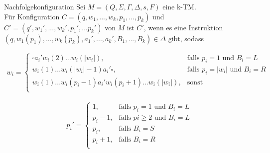 \begin{defn}{Nachfolgekonfiguration}
    Sei $M = (Q, \Sigma, \Gamma, \Delta, s, F)$ eine k-TM. \\

    Für Konfiguration $C=(q,w_1,...,w_k,p_1,...,p_k)$ und $C' = (q', w_1',...,w_k',p_1',...p_k')$ von $M$ ist $C'$, 
    wenn es eine Instruktion $(q, w_1(p_1),...,w_k(p_k),a_1',...,a_k',B_1,...,B_k) \in \Delta$ gibt, sodass

    \begin{align*}  
        w_i =
        \begin{cases} 
            \square a_i' w_i(2) ... w_i(| w_i |), & \text{falls }p_i = 1 \text{ und }  B_i = L \\ 
            w_i(1) ... w_i(|w_i| -1) a_i' \square, & \text{falls }p_i = |w_i| \text{ und } B_i = R\\ 
            w_i(1)...w_i(p_i -1) a_i' w_i(p_i +1)...w_i(| w_i |), &\text{sonst} \\
        \end{cases}
    \end{align*}

    \begin{align*}  
        p_i' =
        \begin{cases} 
            1, & \text{falls } p_i = 1  \text{ und } B_i = L \\ 
            p_i -1, & \text{falls } pi \geq 2 \text{ und } B_i = L \\
            p_i, & \text{falls } B_i = S \\
            p_i + 1, & \text{falls } B_i = R \\
        \end{cases}
    \end{align*}
\end{defn}